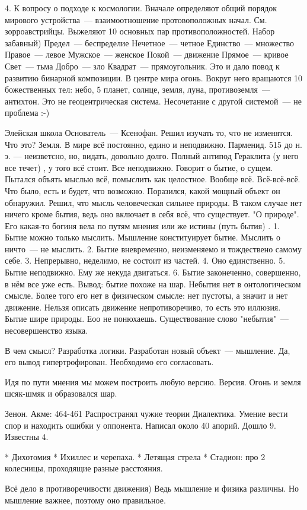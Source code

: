 4. К вопросу о подходе к космологии. Вначале определяют общий порядок мирового устройства~--- взаимоотношение протовоположных начал. См. зорроавстрийцы. Выжеляют 10 основных пар противоположностей. Набор забавный) 
Предел~--- беспределие
Нечетное~--- четное
Единство~--- множество
Правое~--- левое
Мужское~--- женское
Покой~--- движение
Прямое~--- кривое
Свет~--- тьма
Добро~--- зло
Квадрат~--- прямоугольник. 
Это и дало повод к развитию бинарной композиции. 
В центре мира огонь. Вокруг него вращаются 10 божественных тел: небо, 5 планет, солнце, земля, луна, противоземля~--- антихтон. Это не геоцентрическая система. Несочетание с другой системой~--- не проблема :-) 

Элейская школа
Основатель~--- Ксенофан. Решил изучать то, что не изменятся. Что это? Земля. В мире всё постоянно, едино и неподвижно. 
Парменид. 515 до н. э. --- неизветсно, но, видать, довольно долго. Полный антипод Гераклита (у него все течет) , у того всё стоит. Все неподвижно. Говорит о бытие, о сущем. 
Пытался объять мыслью всё, помыслить как целостное. Вообще всё. Всё-всё-всё. Что было, есть и будет, что возможно. Поразился, какой мощный объект он обнаружил. Решил, что мысль человеческая сильнее природы. 
В таком случае нет ничего кроме бытия, ведь оно включает в себя всё, что существует. "О природе". Его какая-то богиня вела по путям мнения или же истины (путь бытия) . 
1. Бытие можно только мыслить. Мышление конституирует бытие. Мыслить о ничто~--- не мыслить. 
2. Бытие вневременно, неизменяемо и тождествено самому себе. 
3. Непрерывно, неделимо, не состоит из частей. 4. Оно единственно. 5. Бытие неподвижно. Ему же некуда двигаться. 
6. Бытие законеченно, совершенно, в нём все уже есть. 
Вывод: бытие похоже на шар. 
Небытия нет в онтологическом смысле. Более того его нет в физическом смысле: нет пустоты, а значит и нет движение. Нельзя описать движение непротиворечиво, то есть это иллюзия. 
Бытие шире природы. Еоо не понюхаешь. 
Существование слово "небытия"~--- несовершенство языка. 

В чем смысл? Разработка логики. Разработан новый объект~--- мышление. Да, его вывод гипертрофирован. Необходимо его согласовать. 

Идя по пути мнения мы можем построить любую версию. 
Версия. Огонь и земля шсяк-шмяк и образовался шар. 

Зенон. Акме: 464-461 
Распространял чужие теории
Диалектика. Умение вести спор и находить ошибки у оппонента. Написал около 40 апорий. Дошло 9. Известны 4. 

	* Дихотомия
	* Ихиллес и черепаха. 
	* Летящая стрела
	* Стадион: про 2 колесницы, проходящие разные расстояния. 

Всё дело в противоречивости движения) Ведь мышление и физика различны. Но мышление важнее, поэтому оно правильное. 
